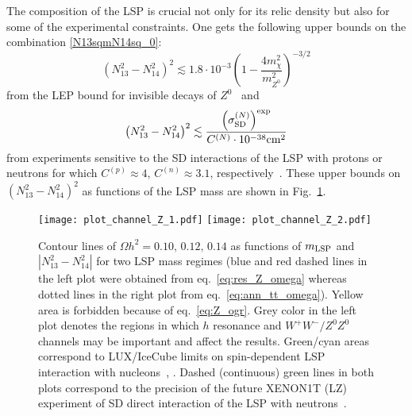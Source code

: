 \documentclass[12pt,twoside]{article}
\begin{document}
The composition of the LSP is crucial not only for its relic density but 
also for some of the experimental constraints. One gets the following 
upper bounds on the combination \eqref{N13sqmN14sq_0}:
%
%
\begin{equation}
\label{eq:sigmaSD_ogr}
\left(N_{13}^2-N_{14}^2\right)^2
\lesssim
1.8\cdot10^{-3} \left(1-\frac{4m_{\chi}^2}{m_{Z^0}^2}\right)^{-3/2}
\end{equation}
%
%
from the LEP bound for invisible decays of $Z^0$~\cite{LEPZinv,Z_inv} and
%
%
\begin{equation}
\label{eq:Z_ogr}
\left(N_{13}^2-N_{14}^2\right)^2
\lesssim
\frac{\left(\sigma_{\rm SD}^{(N)}\right)^{\rm exp}}{C^{(N)}\cdot10^{-38}{\rm cm}^2}
\end{equation}
%
%
from experiments sensitive to the SD interactions of the LSP 
with protons or neutrons for which $C^{(p)}\approx 4$, $C^{(n)}\approx 3.1$, 
respectively~\cite{SD}. These upper bounds on $\left(N_{13}^2-N_{14}^2\right)^2$ 
as functions of the LSP mass are shown in Fig.~\ref{fig:res_Z_limits}. 
%
%
\begin{figure}
\center
\texttt{[image: plot\_channel\_Z\_1.pdf]}
\texttt{[image: plot\_channel\_Z\_2.pdf]}
\caption{Contour lines of $\Omega h^2=0.10,\,0.12,\,0.14$ as functions 
of $m_{\rm LSP}$ and $|N_{13}^2-N_{14}^2|$ for two LSP mass regimes 
(blue and red dashed lines in the left plot were obtained from 
eq.~\eqref{eq:res_Z_omega} whereas dotted lines in the right plot 
from eq.~\eqref{eq:ann_tt_omega}). Yellow area is
forbidden because of eq.~\eqref{eq:Z_ogr}. Grey color in the left 
plot denotes the regions in which $h$ resonance and $W^+W^-/Z^0Z^0$ 
channels may be important and affect the results. Green/cyan areas 
correspond to LUX/IceCube limits on spin-dependent LSP interaction with
nucleons~\cite{LUX_SD_n}, \cite{IceCubeNEW}. 
Dashed (continuous) green lines in both plots correspond 
to the precision of the future XENON1T (LZ) experiment of SD direct 
interaction of the LSP with neutrons~\cite{SD_future}.
}
\label{fig:res_Z_limits}
\end{figure}
%
%
\end{document}
